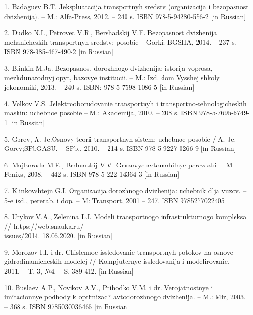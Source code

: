 \begin{noparindent}

1. Badaguev B.T. Jekspluatacija transportnyh sredstv (organizacija i
bezopasnost\textquotesingle{} dvizhenija). -- M.:
Al\textquotesingle fa-Press, 2012. -- 240 s. ISBN 978-5-94280-556-2
{[}in Russian{]}

2. Dudko N.I., Petrovec V.R., Bershadskij V.F.
Bezopasnost\textquotesingle{} dvizhenija mehanicheskih transportnyh
sredstv: posobie -- Gorki: BGSHA, 2014. -- 237 s. ISBN 978-985-467-490-2
{[}in Russian{]}

3. Blinkin M.Ja. Bezopasnost\textquotesingle{} dorozhnogo dvizhenija:
istorija voprosa, mezhdunarodnyj opyt, bazovye institucii. -- M.: Izd.
dom Vysshej shkoly jekonomiki, 2013. -- 240 s. ISBN: 978-5-7598-1086-5
{[}in Russian{]}

4. Volkov V.S. Jelektrooborudovanie transportnyh i
transportno-tehnologicheskih mashin: uchebnoe posobie -- M.: Akademija,
2010. -- 208 s. ISBN 978-5-7695-5749-1 {[}in Russian{]}

5. Gorev, A. Je.Osnovy teorii transportnyh sistem: uchebnoe posobie / A.
Je. Gorev;SPbGASU. -- SPb., 2010. -- 214 s. ISBN 978-5-9227-0266-9 {[}in
Russian{]}

6. Majboroda M.E., Bednarskij V.V. Gruzovye
avtomobil\textquotesingle nye perevozki. -- M.: Feniks, 2008. -- 442 s.
ISBN 978-5-222-14364-3 {[}in Russian{]}

7. Klinkovshtejn G.I. Organizacija dorozhnogo dvizhenija: uchebnik dlja
vuzov. -- 5-e izd., pererab. i dop. -- M: Transport, 2001 -- 247. ISBN
9785277022405

8. Urykov V.A., Zelenina L.I. Modeli transportnogo infrastrukturnogo
kompleksa // https://web.snauka.ru/\\issues/2014. 18.06.2020. {[}in
Russian{]}

9. Morozov I.I. i dr. Chislennoe issledovanie transportnyh potokov na
osnove gidrodinamicheskih modelej // Komp\textquotesingle juternye
issledovanija i modelirovanie. -- 2011. -- T. 3, №4. -- S. 389-412.
{[}in Russian{]}

10. Buslaev A.P., Novikov A.V., Prihod\textquotesingle ko V.M. i dr.
Verojatnostnye i imitacionnye podhody k optimizacii avtodorozhnogo
dvizhenija. -- M.: Mir, 2003. -- 368 s. ISBN 9785030036465 {[}in
Russian{]}
\end{noparindent}


